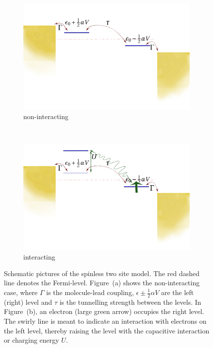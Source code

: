 \vspace{4cm}
\begin{figure}[!h]
    \begin{subfigure}[b]{0.44\textwidth}
        \includegraphics[height=.18\textheight]{pdf/non_interacting_schematics.pdf}\caption{non\hyp{}interacting}\label{fig:twositea}
    \end{subfigure}
    ~
    \begin{subfigure}[!tb]{0.44\textwidth}\vspace{-4.0cm}
        \includegraphics[height=.18\textheight]{pdf/interacting_schematics.pdf}\caption{interacting}\label{fig:twositeb}
    \end{subfigure}
    \caption{Schematic pictures of the spinless two site model. The red dashed line denotes the Fermi-level. Figure~(a) shows the non\hyp{}interacting case, where $\Gamma$ is the molecule-lead coupling, $\epsilon \pm \frac{1}{2} \alpha V$ are the left (right) level and $\tau$ is the tunnelling strength between the levels. In Figure~(b), an electron (large green arrow) occupies the right level. The swirly line is meant to indicate an interaction with electrons on the left level, thereby raising the level with the capacitive interaction or charging energy $U$.} \label{fig:twosite}
\end{figure}

